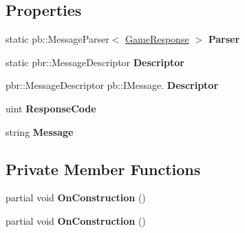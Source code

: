 \subsection*{Properties}
\begin{DoxyCompactItemize}
\item 
\mbox{\label{class_jcoinche_1_1_google_1_1_protobuf_1_1_game_response_a9d29d4b4f4f4d9af6a65a3b5d1610420}} 
static pb\+::\+Message\+Parser$<$ \hyperlink{class_jcoinche_1_1_google_1_1_protobuf_1_1_game_response}{Game\+Response} $>$ {\bfseries Parser}
\item 
\mbox{\label{class_jcoinche_1_1_google_1_1_protobuf_1_1_game_response_a9fb13de0f0522c677abe2e615a309994}} 
static pbr\+::\+Message\+Descriptor {\bfseries Descriptor}
\item 
\mbox{\label{class_jcoinche_1_1_google_1_1_protobuf_1_1_game_response_a4f4bf7fe30d232905136376df7cd91f6}} 
pbr\+::\+Message\+Descriptor pb\+::\+I\+Message. {\bfseries Descriptor}
\item 
\mbox{\label{class_jcoinche_1_1_google_1_1_protobuf_1_1_game_response_a5ff97ca8a57c18c99cef46c749205222}} 
uint {\bfseries Response\+Code}
\item 
\mbox{\label{class_jcoinche_1_1_google_1_1_protobuf_1_1_game_response_af669051fc2b2b04fc143e6bf7d179871}} 
string {\bfseries Message}
\end{DoxyCompactItemize}
\subsection*{Private Member Functions}
\begin{DoxyCompactItemize}
\item 
\mbox{\label{class_jcoinche_1_1_google_1_1_protobuf_1_1_game_response_abff09282306547dc787be1223ccc8f9e}} 
partial void {\bfseries On\+Construction} ()
\item 
\mbox{\label{class_jcoinche_1_1_google_1_1_protobuf_1_1_game_response_abff09282306547dc787be1223ccc8f9e}} 
partial void {\bfseries On\+Construction} ()
\end{DoxyCompactItemize}
